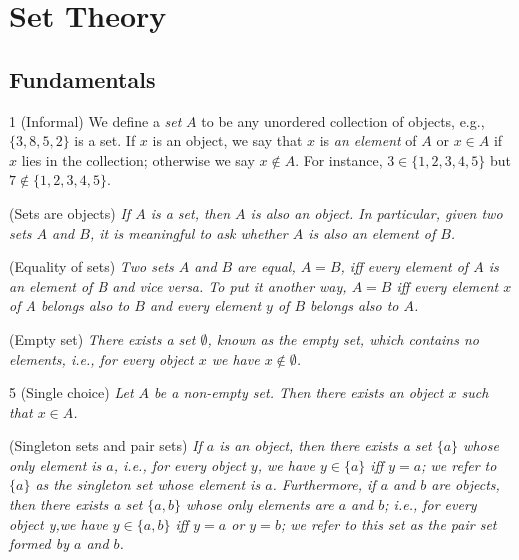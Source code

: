 \section{Set Theory}\label{a1-ch3}
\subsection{Fundamentals}
\begin{definition}{1}
    \label{set-informal}
    (Informal) We define a \emph{set} $A$ to be any unordered collection of objects, e.g., $\{3,8,5,2\}$ is a set. If $x$ is an object, we say that $x$ is \emph{an element} of $A$ or $x\in A$ if $x$ lies in the collection; otherwise we say $x\notin A$. For instance, $3\in \{1,2,3,4,5\}$ but $7\notin \{1,2,3,4,5\}$.
\end{definition}
\begin{axiom}
    \label{ax-sets-are-objects}
    (Sets are objects) \emph{If $A$ is a set, then $A$ is also an object. In particular, given two sets $A$ and $B$, it is meaningful to ask whether $A$ is also an element of $B$.}
\end{axiom}
\begin{axiom}
    \label{ax-set-equality}
    (Equality of sets) \emph{Two sets $A$ and $B$ are equal, $A=B$, iff every element of $A$ is an element of B and vice versa. To put it another way, $A=B$ iff every element $x$ of A belongs also to $B$ and every element $y$ of $B$ belongs also to $A$.}
\end{axiom}
\begin{axiom}
    \label{ax-empty-set}
    (Empty set) \emph{There exists a set $\emptyset$, known as the empty set, which contains no elements, i.e., for every object $x$ we have $x\notin \emptyset$.}
\end{axiom}
\begin{lemma}{5}
    \label{single-choice}
    (Single choice) \emph{Let $A$ be a non-empty set. Then there exists an object $x$ such that $x\in A$.}
\end{lemma}

\begin{axiom}
    \label{ax-singleton-pair}
    (Singleton sets and pair sets) \emph{If $a$ is an object, then there exists a set $\{a\}$ whose only element is $a$, i.e., for every object $y$, we have $y\in \{a\}$ iff $y=a$; we refer to $\{a\}$ as the singleton set whose element is $a$. Furthermore, if $a$ and $b$ are objects, then there exists a set $\{a,b\}$ whose only elements are $a$ and $b$; i.e., for every object y,we have $y\in \{a,b\}$ iff $y=a$ or $y=b$; we refer to this set as the pair set formed by $a$ and $b$.}
\end{axiom}

